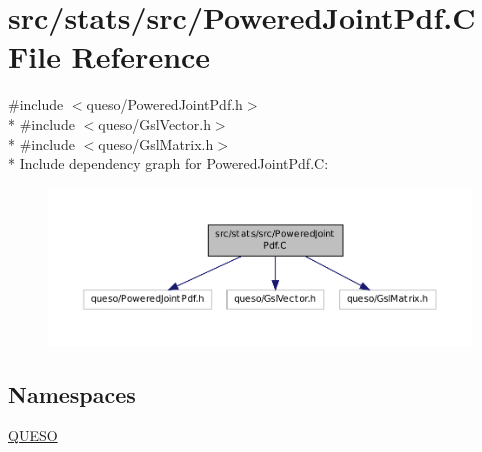 \hypertarget{_powered_joint_pdf_8_c}{\section{src/stats/src/\-Powered\-Joint\-Pdf.C File Reference}
\label{_powered_joint_pdf_8_c}
}
{\ttfamily \#include $<$queso/\-Powered\-Joint\-Pdf.\-h$>$}\\*
{\ttfamily \#include $<$queso/\-Gsl\-Vector.\-h$>$}\\*
{\ttfamily \#include $<$queso/\-Gsl\-Matrix.\-h$>$}\\*
Include dependency graph for Powered\-Joint\-Pdf.\-C\-:
\nopagebreak
\begin{figure}[H]
\begin{center}
\leavevmode
\includegraphics[width=350pt]{_powered_joint_pdf_8_c__incl}
\end{center}
\end{figure}
\subsection*{Namespaces}
\begin{DoxyCompactItemize}
\item 
\hyperlink{namespace_q_u_e_s_o}{Q\-U\-E\-S\-O}
\end{DoxyCompactItemize}

